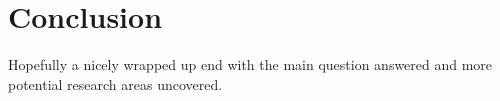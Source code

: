 \chapter{Conclusion}
\label{ch:conclusion}
Hopefully a nicely wrapped up end with the main question answered and more potential research areas uncovered.